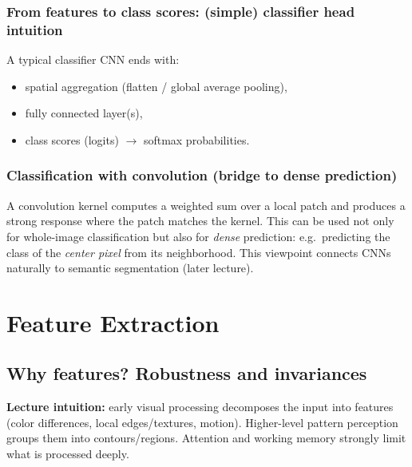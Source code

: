 \documentclass[11pt,a4paper]{article}
\begin{document}
\subsubsection{From features to class scores: (simple) classifier head intuition}
A typical classifier CNN ends with:
\begin{itemize}
  \item spatial aggregation (flatten / global average pooling),
  \item fully connected layer(s),
  \item class scores (logits) $\rightarrow$ softmax probabilities.
\end{itemize}

\subsubsection{Classification with convolution (bridge to dense prediction)}

\begin{intbox}
A convolution kernel computes a weighted sum over a local patch and produces a strong response
where the patch matches the kernel.
This can be used not only for whole-image classification but also for \emph{dense} prediction:
e.g.\ predicting the class of the \emph{center pixel} from its neighborhood.
This viewpoint connects CNNs naturally to semantic segmentation (later lecture).
\end{intbox}

\section{Feature Extraction}

\subsection{Why features? Robustness and invariances}

\begin{notebox}
\textbf{Lecture intuition:}
early visual processing decomposes the input into features (color differences, local edges/textures, motion).
Higher-level pattern perception groups them into contours/regions.
Attention and working memory strongly limit what is processed deeply.
\end{notebox}
\end{document}
